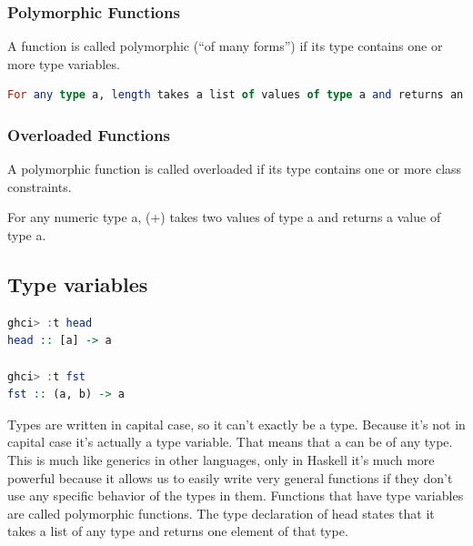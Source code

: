 \clearpage

\hypertarget{polymorphic-functions}{%
\subsubsection{Polymorphic Functions}\label{polymorphic-functions}}

A function is called polymorphic (``of many forms'') if its type
contains one or more type variables.

\begin{lstlisting}[language=Haskell]
For any type a, length takes a list of values of type a and returns an integer.
\end{lstlisting}

\hypertarget{overloaded-functions}{%
\subsubsection{Overloaded Functions}\label{overloaded-functions}}

A polymorphic function is called overloaded if its type contains one or
more class constraints.

\begin{tcolorbox}[colback=red!5!white,colframe=red!75!black]
For any numeric type a, (+) takes two values of type a and returns a value of type a.
\end{tcolorbox}

\subsection{Type variables}

\begin{lstlisting}[language=Haskell]
ghci> :t head  
head :: [a] -> a

ghci> :t fst  
fst :: (a, b) -> a  
\end{lstlisting}

Types are written in capital case, so it can't exactly be a type. Because it's not in capital case it's actually a type variable. That means that a can be of any type. This is much like generics in other languages, only in Haskell it's much more powerful because it allows us to easily write very general functions if they don't use any specific behavior of the types in them. Functions that have type variables are called polymorphic functions. The type declaration of head states that it takes a list of any type and returns one element of that type.

\clearpage
